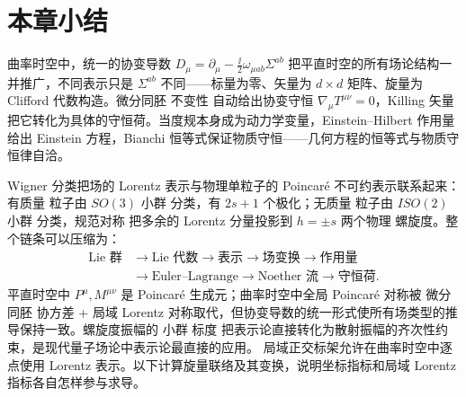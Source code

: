 \section*{本章小结}

曲率时空中，统一的协变导数 $D_\mu=\partial_\mu-\frac{\ii}{2}\omega_{\mu ab}\Sigma^{ab}$ 把平直时空的所有场论结构一并推广，不同表示只是 $\Sigma^{ab}$ 不同——标量为零、矢量为 $d\times d$ 矩阵、旋量为 Clifford 代数构造。微分同胚 不变性 自动给出协变守恒 $\nabla_\mu T^{\mu\nu}=0$，Killing 矢量把它转化为具体的守恒荷。当度规本身成为动力学变量，Einstein--Hilbert 作用量给出 Einstein 方程，Bianchi 恒等式保证物质守恒——几何方程的恒等式与物质守恒律自洽。

Wigner 分类把场的 Lorentz 表示与物理单粒子的 Poincaré 不可约表示联系起来：有质量 粒子由 $SO(3)$ 小群 分类，有 $2s+1$ 个极化；无质量 粒子由 $ISO(2)$ 小群 分类，规范对称 把多余的 Lorentz 分量投影到 $h=\pm s$ 两个物理 螺旋度。整个链条可以压缩为：
\begin{align*}
\text{Lie 群}&\to\text{Lie 代数}\to\text{表示}
\to\text{场变换}\to\text{作用量}\\
&\to\text{Euler--Lagrange}\to\text{Noether 流}
\to\text{守恒荷}.
\end{align*}
平直时空中 $P^\mu,M^{\mu\nu}$ 是 Poincaré 生成元；曲率时空中全局 Poincaré 对称被 微分同胚 协方差 + 局域 Lorentz 对称取代，但协变导数的统一形式使所有场类型的推导保持一致。螺旋度振幅的 小群 标度 把表示论直接转化为散射振幅的齐次性约束，是现代量子场论中表示论最直接的应用。
局域正交标架允许在曲率时空中逐点使用 Lorentz 表示。以下计算旋量联络及其变换，说明坐标指标和局域 Lorentz 指标各自怎样参与求导。




